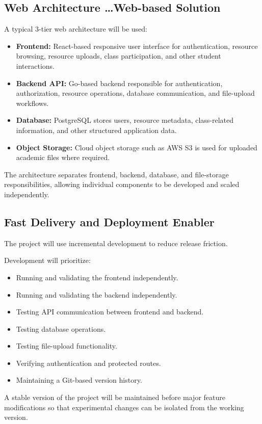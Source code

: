 \documentclass[11pt,a4paper]{article}
\begin{document}
\subsection{Web Architecture \dots Web-based Solution}
A typical 3-tier web architecture will be used:
\begin{itemize}[leftmargin=*]
    \item \textbf{Frontend:} React-based responsive user interface for authentication, resource browsing, resource uploads, class participation, and other student interactions.
    \item \textbf{Backend API:} Go-based backend responsible for authentication, authorization, resource operations, database communication, and file-upload workflows.
    \item \textbf{Database:} PostgreSQL stores users, resource metadata, class-related information, and other structured application data.
    \item \textbf{Object Storage:} Cloud object storage such as AWS S3 is used for uploaded academic files where required.
\end{itemize}

The architecture separates frontend, backend, database, and file-storage responsibilities, allowing individual components to be developed and scaled independently.

\subsection{Fast Delivery and Deployment Enabler}
The project will use incremental development to reduce release friction.

Development will prioritize:
\begin{itemize}[leftmargin=*]
    \item Running and validating the frontend independently.
    \item Running and validating the backend independently.
    \item Testing API communication between frontend and backend.
    \item Testing database operations.
    \item Testing file-upload functionality.
    \item Verifying authentication and protected routes.
    \item Maintaining a Git-based version history.
\end{itemize}

A stable version of the project will be maintained before major feature modifications so that experimental changes can be isolated from the working version.
\end{document}
